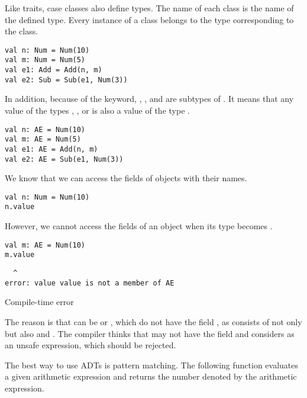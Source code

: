 Like traits, case classes also define types. The name of each class is the name
of the defined type. Every instance of a class belongs to the type corresponding
to the class.

\begin{verbatim}
val n: Num = Num(10)
val m: Num = Num(5)
val e1: Add = Add(n, m)
val e2: Sub = Sub(e1, Num(3))
\end{verbatim}

In addition, because of the  keyword, , , and
 are subtypes of . It means that any value of the types
, , or  is also a value of the type .

\begin{verbatim}
val n: AE = Num(10)
val m: AE = Num(5)
val e1: AE = Add(n, m)
val e2: AE = Sub(e1, Num(3))
\end{verbatim}

We know that we can access the fields of objects with their names.

\begin{verbatim}
val n: Num = Num(10)
n.value
\end{verbatim}

However, we cannot access the fields of an object when its type becomes .

\begin{verbatim}
val m: AE = Num(10)
m.value
\end{verbatim}
\vspace{-1em}
\begin{mdframed}[hidealllines=true,backgroundcolor=red!10,innerleftmargin=3pt,innerrightmargin=3pt,leftmargin=-3pt,rightmargin=-3pt]
\begin{verbatim}
  ^
error: value value is not a member of AE
\end{verbatim}
\vspace{-2em}
\begin{flushright}
\scriptsize\textsf{Compile-time error}
\end{flushright}
\end{mdframed}

The reason is that  can be  or , which do not have
the field , as  consists of not only  but also
 and . The compiler thinks that  may not have the
field  and considers  as an unsafe expression, which
should be rejected.

The best way to use ADTs is pattern matching. The following function evaluates a
given arithmetic expression and returns the number denoted by the arithmetic
expression.

